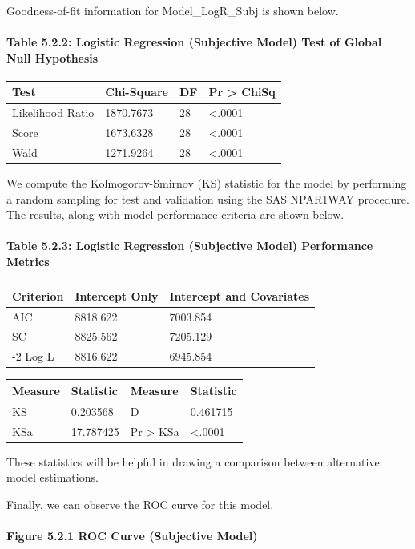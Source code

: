 \documentclass[]{article}
\let\oldparagraph\paragraph
\renewcommand{\paragraph}[1]{\oldparagraph{#1}\mbox{}}
\begin{document}
Goodness-of-fit information for Model\_LogR\_Subj is shown below.

\paragraph{Table 5.2.2: Logistic Regression (Subjective Model) Test of
Global Null
Hypothesis}\label{table-5.2.2-logistic-regression-subjective-model-test-of-global-null-hypothesis}

\begin{longtable}[]{@{}llll@{}}
\toprule
Test & Chi-Square & DF & Pr \textgreater{} ChiSq\tabularnewline
\midrule
\endhead
Likelihood Ratio & 1870.7673 & 28 & \textless{}.0001\tabularnewline
Score & 1673.6328 & 28 & \textless{}.0001\tabularnewline
Wald & 1271.9264 & 28 & \textless{}.0001\tabularnewline
\bottomrule
\end{longtable}

We compute the Kolmogorov-Smirnov (KS) statistic for the model by
performing a random sampling for test and validation using the SAS
NPAR1WAY procedure. The results, along with model performance criteria
are shown below.

\paragraph{Table 5.2.3: Logistic Regression (Subjective Model)
Performance
Metrics}\label{table-5.2.3-logistic-regression-subjective-model-performance-metrics}

\begin{longtable}[]{@{}lll@{}}
\toprule
Criterion & Intercept Only & Intercept and Covariates\tabularnewline
\midrule
\endhead
AIC & 8818.622 & 7003.854\tabularnewline
SC & 8825.562 & 7205.129\tabularnewline
-2 Log L & 8816.622 & 6945.854\tabularnewline
\bottomrule
\end{longtable}

\begin{longtable}[]{@{}llll@{}}
\toprule
Measure & Statistic & Measure & Statistic\tabularnewline
\midrule
\endhead
KS & 0.203568 & D & 0.461715\tabularnewline
KSa & 17.787425 & Pr \textgreater{} KSa &
\textless{}.0001\tabularnewline
\bottomrule
\end{longtable}

These statistics will be helpful in drawing a comparison between
alternative model estimations.

Finally, we can observe the ROC curve for this model.

\paragraph{Figure 5.2.1 ROC Curve (Subjective
Model)}\label{figure-5.2.1-roc-curve-subjective-model}
\end{document}
